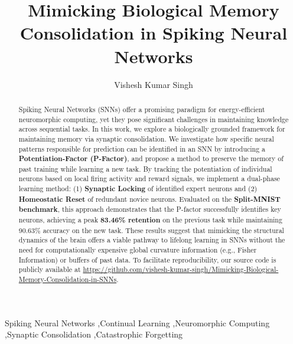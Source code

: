 \documentclass[5p,times]{elsarticle}
\begin{document}
\begin{frontmatter}

\title{Mimicking Biological Memory Consolidation in Spiking Neural Networks}

\author[inst1]{Vishesh Kumar Singh}


\begin{abstract}
Spiking Neural Networks (SNNs) offer a promising paradigm for energy-efficient neuromorphic computing, yet they pose significant challenges in maintaining knowledge across sequential tasks. In this work, we explore a biologically grounded framework for maintaining memory via synaptic consolidation. We investigate how specific neural patterns responsible for prediction can be identified in an SNN by introducing a \textbf{Potentiation-Factor (P-Factor)}, and propose a method to preserve the memory of past training while learning a new task. By tracking the potentiation of individual neurons based on local firing activity and reward signals, we implement a dual-phase learning method: (1) \textbf{Synaptic Locking} of identified expert neurons and (2) \textbf{Homeostatic Reset} of redundant novice neurons. Evaluated on the \textbf{Split-MNIST benchmark}, this approach demonstrates that the P-factor successfully identifies key neurons, achieving a peak \textbf{83.46\% retention} on the previous task while maintaining 90.63\% accuracy on the new task. These results suggest that mimicking the structural dynamics of the brain offers a viable pathway to lifelong learning in SNNs without the need for computationally expensive global curvature information (e.g., Fisher Information) or buffers of past data.
To facilitate reproducibility, our source code is publicly available at \url{https://github.com/vishesh-kumar-singh/Mimicking-Biological-Memory-Consolidation-in-SNNs}.
\end{abstract}

\begin{keyword}
Spiking Neural Networks \sep Continual Learning \sep Neuromorphic Computing \sep Synaptic Consolidation \sep Catastrophic Forgetting
\end{keyword}

\end{frontmatter}
\end{document}
